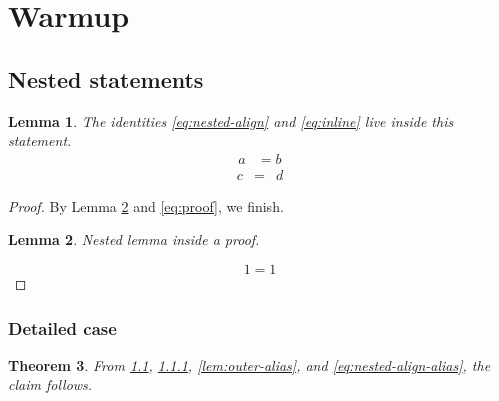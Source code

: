 \documentclass{amsart}
\newtheorem{theorem}{Theorem}[section]
\newtheorem{lemma}[theorem]{Lemma}
\begin{document}
\section{Warmup}
\label{sec:warmup}

\subsection{Nested
statements}
\label{subsec:nested}

\begin{lemma}\label{lem:outer}\label{lem:outer-alias}
The identities \eqref{eq:nested-align} and \eqref{eq:inline} live inside this statement.
\begin{align}\label{eq:nested-align}\label{eq:nested-align-alias}
a &= b
\end{align}
\begin{eqnarray}\label{eq:inline} c &=& d \end{eqnarray}
\end{lemma}

\begin{proof}
By Lemma \ref{lem:inner} and \eqref{eq:proof}, we finish.
\begin{lemma}\label{lem:inner}
Nested lemma inside a proof.
\end{lemma}
\begin{equation}\label{eq:proof}
1 = 1
\end{equation}
\end{proof}

\subsubsection{Detailed case}
\label{subsubsec:detail}

\begin{theorem}\label{thm:uses-headings}
From \ref{subsec:nested}, \ref{subsubsec:detail}, \ref{lem:outer-alias}, and \eqref{eq:nested-align-alias}, the claim follows.
\end{theorem}
\end{document}

